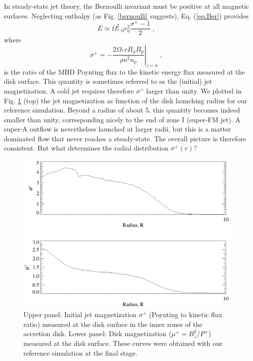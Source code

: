 \documentclass{aa}
\begin{document}
In steady-state jet theory, the Bernoulli invariant must be positive at all magnetic surfaces. Neglecting enthalpy (as Fig. \ref{bernoulli} suggests), Eq. (\ref{eq:Ber}) provides
\begin{equation}
E \simeq \Omega_{*,0}^2 r_0^2 \frac{\sigma^+ - 1}{2} \; ,
\end{equation}
where
\begin{equation}
\sigma^+= - \left . \frac{ 2 \Omega_* r B_\phi B_\mathrm{p} } { \rho u^2 u_\mathrm{p} } \right |_{z=h} \; ,
\end{equation}
is the ratio of the MHD Poynting flux to the kinetic energy flux measured at the disk surface. This quantity is sometimes referred to as the (initial) jet magnetization. A cold jet requires therefore
$\sigma^+$ larger than unity. We plotted in Fig. \ref{sigmu} (top) the jet magnetization as function of the disk launching radius for our reference simulation. Beyond a radius of about 5, this quantity
becomes indeed smaller than unity, corresponding nicely to the end of zone I (super-FM jet). A super-A outflow is nevertheless launched at larger radii, but this is a matter dominated flow that never
reaches a steady-state. The overall picture is therefore consistent. But what determines the radial distribution $\sigma^+(r)$?

   \begin{figure}
   \centering \includegraphics[width=\columnwidth]{12633f15.eps}
   \caption{Upper panel: Initial jet magnetization $\sigma^+$ (Poynting to kinetic flux ratio) measured at the disk surface in the inner zones of the accretion disk. Lower panel: Disk magnetization
   ($\mu^+=B_z^2/ P^+$) measured at the disk surface. These curves were obtained with our reference simulation at the final stage.}
              \label{sigmu}%
    \end{figure}
\end{document}
